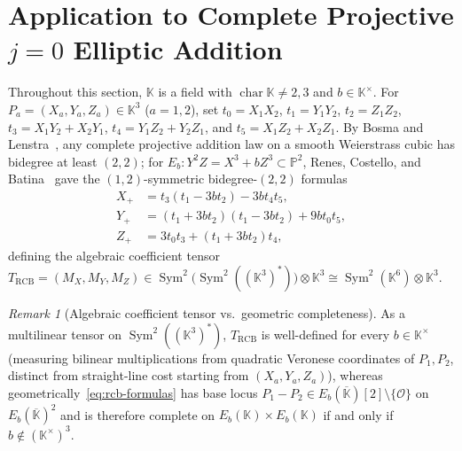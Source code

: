 \documentclass[11pt,reqno]{amsart}
\theoremstyle{definition}
\theoremstyle{remark}
\newtheorem{remark}[theorem]{Remark}
\numberwithin{equation}{section}
\newcommand{\KK}{\mathbb{K}}
\newcommand{\PP}{\mathbb{P}}
\newcommand{\cO}{\mathcal{O}}
\DeclareMathOperator{\Sym}{Sym}
\DeclareMathOperator{\chr}{char}
\begin{document}
\section{Application to Complete Projective \texorpdfstring{$j = 0$}{j = 0} Elliptic Addition}\label{sec:rcb}

Throughout this section, $\KK$ is a field with $\chr\KK \neq 2, 3$ and $b \in \KK^\times$. For $P_a = (X_a, Y_a, Z_a) \in \KK^3$ ($a = 1, 2$), set $t_0 = X_1 X_2$, $t_1 = Y_1 Y_2$, $t_2 = Z_1 Z_2$, $t_3 = X_1 Y_2 + X_2 Y_1$, $t_4 = Y_1 Z_2 + Y_2 Z_1$, and $t_5 = X_1 Z_2 + X_2 Z_1$. By Bosma and Lenstra~\cite{BosmaLenstra1995}, any complete projective addition law on a smooth Weierstrass cubic has bidegree at least $(2, 2)$; for $E_b : Y^2 Z = X^3 + b Z^3 \subset \PP^2$, Renes, Costello, and Batina~\cite[Algorithm~7]{RCB2016} gave the $(1,2)$-symmetric bidegree-$(2,2)$ formulas
\begin{equation}\label{eq:rcb-formulas}
\begin{aligned}
  X_+ &= t_3(t_1 - 3b t_2) - 3b t_4 t_5, \\
  Y_+ &= (t_1 + 3b t_2)(t_1 - 3b t_2) + 9b t_0 t_5, \\
  Z_+ &= 3 t_0 t_3 + (t_1 + 3b t_2) t_4,
\end{aligned}
\end{equation}
defining the algebraic coefficient tensor $T_{\mathrm{RCB}} = (M_X, M_Y, M_Z) \in \Sym^2\bigl(\Sym^2((\KK^3)^*)\bigr) \otimes \KK^3 \cong \Sym^2(\KK^6) \otimes \KK^3$.

\begin{remark}[Algebraic coefficient tensor vs.\ geometric completeness]\label{rem:rcb-alg-geom}
As a multilinear tensor on $\Sym^2((\KK^3)^*)$, $T_{\mathrm{RCB}}$ is well-defined for every $b \in \KK^\times$ (measuring bilinear multiplications from quadratic Veronese coordinates of $P_1, P_2$, distinct from straight-line cost starting from $(X_a, Y_a, Z_a)$), whereas geometrically~\eqref{eq:rcb-formulas} has base locus $P_1 - P_2 \in E_b(\overline{\KK})[2]\setminus\{\cO\}$ on $E_b(\overline{\KK})^2$ and is therefore complete on $E_b(\KK) \times E_b(\KK)$ if and only if $b \notin (\KK^\times)^3$.
\end{remark}
\end{document}
